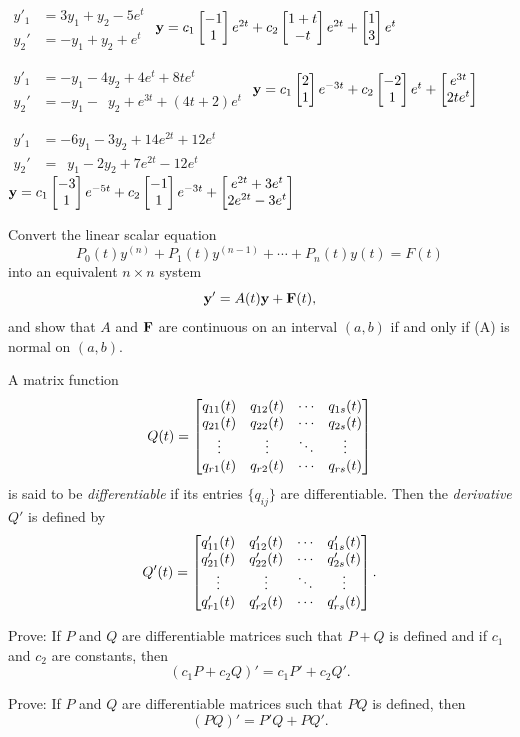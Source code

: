 \begin{exerciselist}
\begin{alist}[itemsep=1ex]
\item %
$\begin{aligned}
y'_1&=3y_1+y_2-5e^t \\
y_2'&=-y_1+y_2+e^t\end{aligned}$
\quad
$\mathbf{y}=c_1\begin{bmatrix}-1\\1\end{bmatrix}e^{2t}+c_2\begin{bmatrix}1+t\\-t\end{bmatrix}e^{2t}+\begin{bmatrix}1\\3\end{bmatrix}e^t$

\item %
$\begin{aligned}
y'_1&=-y_1-4y_2+4e^t+8te^t \\
y_2'&=-y_1-\phantom{4}y_2+e^{3t}+(4t+2)e^t\end{aligned}$
\quad
$\mathbf{y}=c_1\begin{bmatrix}2\\1\end{bmatrix}e^{-3t}+c_2\begin{bmatrix}-2\\1\end{bmatrix}e^t
+\begin{bmatrix}e^{3t}\\2te^t\end{bmatrix}$

\item %
$\begin{aligned}
y'_1&=-6y_1-3y_2+14e^{2t}+12e^t \\
y_2'&=\phantom{6}y_1-2y_2+7e^{2t}-12e^t\end{aligned}$
\quad
$\mathbf{y}=c_1\begin{bmatrix}-3\\1\end{bmatrix}e^{-5t}+c_2\begin{bmatrix}-1\\1\end{bmatrix}e^{-3t}
+\begin{bmatrix}e^{2t}+3e^t\\2e^{2t}-3e^t\end{bmatrix}$

\end{alist}

\item\label{exer:10.2.6}Convert the linear scalar equation
\[
P_0(t)y^{(n)}+P_1(t)y^{(n-1)}+\cdots+P_n(t)y(t)=F(t)
\tag{A}
\]
into an equivalent $n\times n$ system
\[
\mathbf{y'}=A(t)\mathbf{y}+\mathbf{F}(t),
\]
and show that $A$ and $\mathbf{F}$ are continuous on an interval
$(a,b)$ if and only if (A) is normal on $(a,b)$.

\item\label{exer:10.2.7}A matrix function
\[
Q(t)=\begin{bmatrix}q_{11}(t)&q_{12}(t)&\cdots &q_{1s}(t)\\q_{21}(t)&q_{22}(t)&\cdots&q_{2s}(t)\\\vdots& \vdots&\ddots&\vdots\\q_{r1}(t)&q_{r2}(t)&\cdots&q_{rs}(t) \end{bmatrix}
\]
is  said to be  \emph{\color{blue}differentiable}
if its entries $\{q_{ij}\}$ are  differentiable.  Then the
\emph{\color{blue}derivative} $Q'$ is defined by
 \[
Q'(t)=\begin{bmatrix}q'_{11}(t)&q'_{12}(t)&\cdots &q'_{1s}(t)\\q'_{21}(t)&q'_{22}(t)&\cdots&q'_{2s}(t)\\\vdots& \vdots&\ddots&\vdots\\q'_{r1}(t)&q'_{r2}(t)&\cdots&q'_{rs}(t) \end{bmatrix}.
\]
\begin{alist}
\item %
Prove: If $P$ and $Q$ are differentiable matrices such that $P+Q$ is
defined and if  $c_1$ and $c_2$ are constants, then
\[
(c_1P+c_2Q)'=c_1P'+c_2Q'.
\]
\item %
Prove: If $P$ and $Q$ are differentiable matrices such that $PQ$ is
defined, then
\[
(PQ)'=P'Q+PQ'.
\]
\end{alist}


\end{exerciselist}
